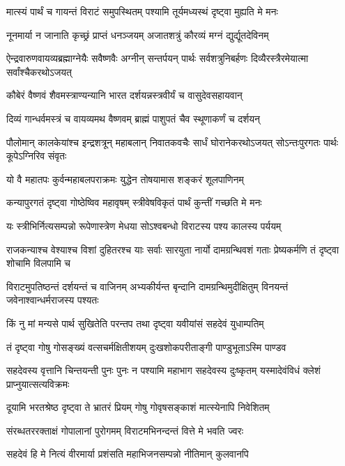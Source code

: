 \twolineshloka
{मात्स्यं पार्थं च गायन्तं विराटं समुपस्थितम्}
{पश्यामि तूर्यमध्यस्थं दृष्ट्वा मुह्यति मे मनः}


\twolineshloka
{नूनमार्या न जानाति कृच्छ्रं प्राप्तं धनञ्जयम्}
{अजातशत्रुं कौरव्यं मग्नं द्युर्द्यूतदेविनम्}


\threelineshloka
{ऐन्द्रवारुणवायव्यब्रह्माग्नेयैः सवैष्णवैः}
{अग्नीन् सन्तर्पयन् पार्थः सर्वशत्रुनिबर्हणः}
{दिव्यैरस्त्रैरमेयात्मा सर्वांश्चैकरथोऽजयत्}


\twolineshloka
{कौबेरं वैष्णवं शैवमस्त्राण्यन्यानि भारत}
{दर्शयन्नस्त्रवीर्यं च वासुदेवसहायवान्}


\twolineshloka
{दिव्यं गान्धर्वमस्त्रं च वायव्यमथ वैष्णवम्}
{ब्राह्मं पाशुपतं चैव स्थूणाकर्णं च दर्शयन्}


\threelineshloka
{पौलोमान् कालकेयांश्च इन्द्रशत्रून् महाबलान्}
{निवातकवचैः सार्धं घोरानेकरथोऽजयत्}
{सोऽन्तःपुरगतः पार्थः कूपेऽग्निरिव संवृतः}


\twolineshloka
{यो वै महातपः कुर्वन्महाबलपराक्रमः}
{युद्धेन तोषयामास शङ्करं शूलपाणिनम्}


\twolineshloka
{कन्यापुरगतं दृष्ट्वा गोष्ठेष्विव महावृषम्}
{स्त्रीवेषविकृतं पार्थं कुन्तीं गच्छति मे मनः}


\twolineshloka
{यः स्त्रीभिर्नित्यसम्पन्नो रूपेणास्त्रेण मेधया}
{सोऽश्वबन्धो विराटस्य पश्य कालस्य पर्ययम्}


\threelineshloka
{राजकन्याश्च वेश्याश्च विशां दुहितरश्च याः}
{सर्वाः सारयुता नार्यो दामग्रन्थिवशं गताः}
{प्रेष्यकर्मणि तं दृष्ट्वा शोचामि विलपामि च}


\threelineshloka
{विराटमुपतिष्ठन्तं दर्शयन्तं च वाजिनम्}
{अभ्यकीर्यन्त बृन्दानि दामग्रन्थिमुदीक्षितुम्}
{विनयन्तं जवेनाश्वान्धर्मराजस्य पश्यतः}


\twolineshloka
{किं नु मां मन्यसे पार्थ सुखितेति परन्तप}
{तथा दृष्ट्वा यवीयांसं सहदेवं युधाम्पतिम्}


\twolineshloka
{तं दृष्ट्वा गोषु गोसङ्ख्यं वत्सचर्मक्षितीशयम्}
{दुःखशोकपरीताङ्गी पाण्डुभूताऽस्मि पाण्डव}


\threelineshloka
{सहदेवस्य वृत्तानि चिन्तयन्ती पुनः पुनः}
{न पश्यामि महाभाग सहदेवस्य दुःष्कृतम्}
{यस्मादेवंविधं क्लेशं प्राप्नुयात्सत्यविक्रमः}


\twolineshloka
{दूयामि भरतश्रेष्ठ दृष्ट्वा ते भ्रातरं प्रियम्}
{गोषु गोवृषसङ्काशं मात्स्येनापि निवेशितम्}


\twolineshloka
{संरब्धतररक्ताक्षं गोपालानां पुरोगमम्}
{विराटमभिनन्दन्तं वित्ते मे भवति ज्वरः}


\twolineshloka
{सहदेवं हि मे नित्यं वीरमार्या प्रशंसति}
{महाभिजनसम्पन्नो नीतिमान् कुलवानपि}


